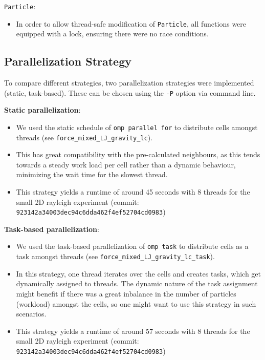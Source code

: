 \documentclass{article}
\begin{document}
\texttt{Particle}:
\begin{itemize}
    \item{In order to allow thread-safe modification of \texttt{Particle}, all functions were equipped with a lock, ensuring there were no race conditions.}
\end{itemize}

\subsection{Parallelization Strategy}
To compare different strategies, two parallelization strategies were implemented (static, task-based).
These can be chosen using the \texttt{-P} option via command line.

\textbf{Static parallelization}:
\begin{itemize}
    \item{We used the static schedule of \texttt{omp parallel for} to distribute cells amongst threads (see \texttt{force\_mixed\_LJ\_gravity\_lc}).}
    \item{This has great compatibility with the pre-calculated neighbours, as this tends towards a steady work load per cell rather than a dynamic behaviour, minimizing the wait time for the slowest thread.}
    \item{This strategy yields a runtime of around 45 seconds with 8 threads for the small 2D rayleigh experiment (commit: \texttt{923142a34003dec94c6dda462f4ef52704cd0983})}
\end{itemize}

\textbf{Task-based parallelization}:
\begin{itemize}
    \item{We used the task-based parallelization of \texttt{omp task} to distribute cells as a task amongst threads (see \texttt{force\_mixed\_LJ\_gravity\_lc\_task}).}
    \item{In this strategy, one thread iterates over the cells and creates tasks, which get dynamically assigned to threads. The dynamic nature of the task assignment might benefit if there was a great inbalance in the number of particles (workload) amongst the cells, so one might want to use this strategy in such scenarios.}
    \item{This strategy yields a runtime of around 57 seconds with 8 threads for the small 2D rayleigh experiment (commit: \texttt{923142a34003dec94c6dda462f4ef52704cd0983})}
\end{itemize}
\end{document}
